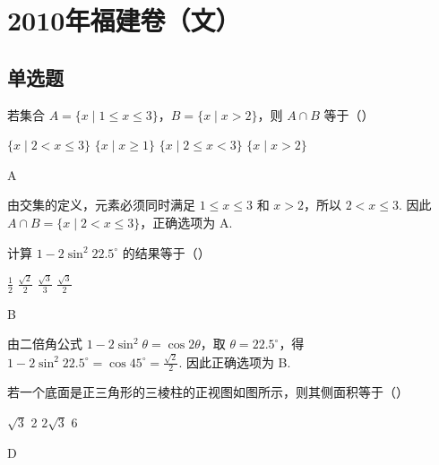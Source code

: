 \chapter{2010年福建卷（文）}

\section{单选题}

\begin{problem}
若集合 \(A = \{x \mid 1 \leqslant x \leqslant 3\}\)，\(B = \{x \mid x > 2\}\)，则 \(A \cap B\) 等于（\quad）

\choices
    {\(\{x \mid 2 < x \leqslant 3\}\)}
    {\(\{x\mid x\geqslant 1\}\)}
    {\(\{x\mid 2\leqslant x < 3\}\)}
    {\(\{x\mid x > 2\}\)}
\end{problem}

\begin{answer}
A
\end{answer}

\begin{solution}
由交集的定义，元素必须同时满足 \(1\leqslant x\leqslant3\) 和 \(x>2\)，所以 \(2<x\leqslant3\). 因此
\(A\cap B=\{x\mid 2<x\leqslant3\}\)，正确选项为 A.
\end{solution}

\begin{problem}
计算 \(1 - 2\sin^2 22.5^\circ\) 的结果等于（\quad）

\choices
    {\(\frac{1}{2}\)}
    {\(\frac{\sqrt{2}}{2}\)}
    {\(\frac{\sqrt{3}}{3}\)}
    {\(\frac{\sqrt{3}}{2}\)}
\end{problem}

\begin{answer}
B
\end{answer}

\begin{solution}
由二倍角公式 \(1-2\sin^2\theta=\cos2\theta\)，取 \(\theta=22.5^\circ\)，得
\(1-2\sin^2 22.5^\circ=\cos45^\circ=\frac{\sqrt{2}}{2}\). 因此正确选项为 B.
\end{solution}

\begin{problem}
若一个底面是正三角形的三棱柱的正视图如图所示，则其侧面积等于（\quad）


\choices
    {\(\sqrt{3}\)}
    {2}
    {\(2\sqrt{3}\)}
    {6}
\end{problem}

\begin{answer}
D
\end{answer}

